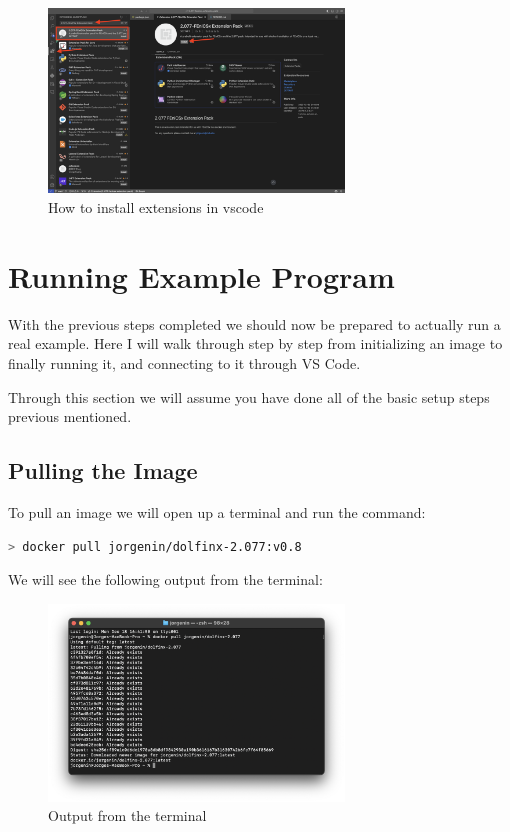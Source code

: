 \documentclass[final]{article}
\numberwithin{equation}{section}
\theoremstyle{remarkStyle}
\begin{document}
\begin{figure}[H]
  \centering
  \includegraphics[width=0.7\textwidth]{VSCodeExtensionInstall.png}
  \caption{How to install extensions in vscode}%
  \label{fig:vscode_extension_install}%
\end{figure}


\section{Running Example Program}

With the previous steps completed we should now be prepared to actually run a real example.
Here I will walk through step by step from initializing an image to finally running it, and connecting to it through VS Code.

Through this section we will assume you have done all of the basic setup steps previous mentioned.

\subsection{Pulling the Image}
To pull an image we will open up a terminal and run the command:
\begin{lstlisting}[language=bash, caption=Docker Pull Command]
  > docker pull jorgenin/dolfinx-2.077:v0.8
\end{lstlisting}

We will see the following output from the terminal:
\begin{figure}[H]
  \centering
  \includegraphics[width=0.7\textwidth]{TerminalImage_pull.png}
  \caption{Output from the terminal}%
  \label{fig:Terminal_pull_done_2}%
\end{figure}
\end{document}

